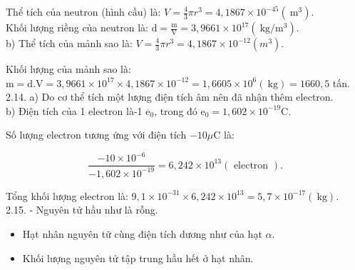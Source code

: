 \documentclass[10pt]{article}
\begin{document}
Thể tích của neutron (hình cầu) là: $V=\frac{4}{3} \pi r^{3}=4,1867 \times 10^{-45}\left(\mathrm{~m}^{3}\right)$.\\
Khối lượng riềng của neutron là: $\mathrm{d}=\frac{\mathrm{m}}{\mathrm{V}}=3,9661 \times 10^{17}\left(\mathrm{~kg} / \mathrm{m}^{3}\right)$.\\
b) Thể tích của mảnh sao là: $V=\frac{4}{3} \pi r^{3}=4,1867 \times 10^{-12}\left(m^{3}\right)$.

Khối lượng của mảnh sao là:\\
$\mathrm{m}=\mathrm{d} . \mathrm{V}=3,9661 \times 10^{17} \times 4,1867 \times 10^{-12}=1,6605 \times 10^{6}(\mathrm{~kg})=1660,5$ tấn.\\
2.14. a) Do cơ thể tích một lượng điện tích âm nên đã nhận thêm electron.\\
b) Điện tích của 1 electron là-1 $\mathrm{e}_{0}$, trong đó $\mathrm{e}_{0}=1,602 \times 10^{-19} \mathrm{C}$.

Số lượng electron tương ứng với điện tích $-10 \mu \mathrm{C}$ là:

$$
\frac{-10 \times 10^{-6}}{-1,602 \times 10^{-19}}=6,242 \times 10^{13}(\text { electron }) .
$$

Tổng khối lượng electron là: $9,1 \times 10^{-31} \times 6,242 \times 10^{13}=5,7 \times 10^{-17}(\mathrm{~kg})$.\\
2.15. - Nguyên tử hầu như là rỗng.

\begin{itemize}
  \item Hạt nhân nguyên tữ cùng điện tích dương như của hạt $\alpha$.
  \item Khối lượng nguyên tử tập trung hầu hết ở hạt nhân.
\end{itemize}
\end{document}
